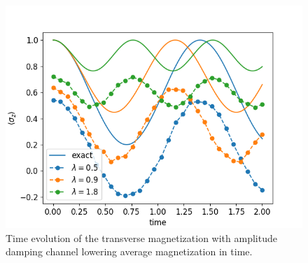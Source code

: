 \documentclass[12pt, twocolumn]{article}
\begin{document}
  \begin{figure}
    \centering
    \includegraphics[width=\linewidth]{images/amplitude_damping_channel.png}
    \caption{Time evolution of the transverse magnetization with amplitude damping channel lowering average magnetization in time.%
      \label{fig:amplitude-damping-channel}}
  \end{figure}
\end{document}
